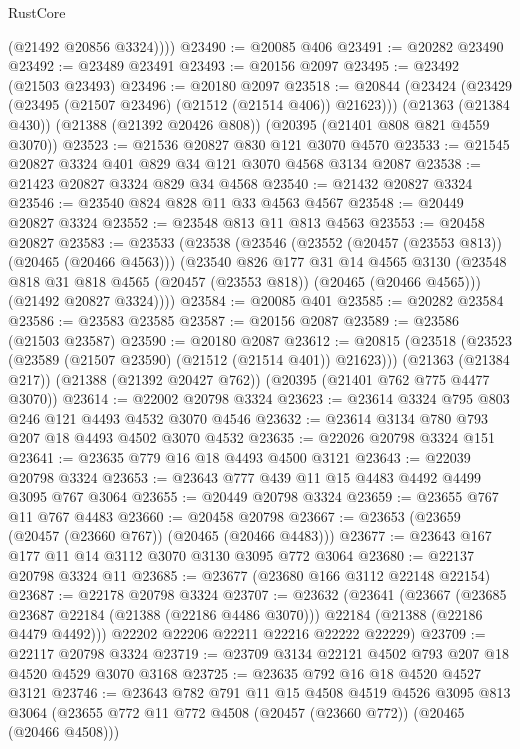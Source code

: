 \begin{lexlean}{RustCore}
\begin{coremodule}
          (@21492 @20856 @3324))))
@23490 := @20085 @406
@23491 := @20282 @23490
@23492 := @23489 @23491
@23493 := @20156 @2097
@23495 := @23492 (@21503 @23493)
@23496 := @20180 @2097
@23518 := @20844
    (@23424 (@23429 (@23495 (@21507 @23496) (@21512 (@21514 @406)) @21623)))
    (@21363 (@21384 @430))
    (@21388 (@21392 @20426 @808))
    (@20395 (@21401 @808 @821 @4559 @3070))
@23523 := @21536 @20827 @830 @121 @3070 @4570
@23533 := @21545 @20827 @3324 @401 @829 @34 @121 @3070 @4568 @3134 @2087
@23538 := @21423 @20827 @3324 @829 @34 @4568
@23540 := @21432 @20827 @3324
@23546 := @23540 @824 @828 @11 @33 @4563 @4567
@23548 := @20449 @20827 @3324
@23552 := @23548 @813 @11 @813 @4563
@23553 := @20458 @20827
@23583 := @23533
    (@23538
      (@23546
        (@23552 (@20457 (@23553 @813)) (@20465 (@20466 @4563)))
        (@23540
          @826
          @177
          @31
          @14
          @4565
          @3130
          (@23548 @818 @31 @818 @4565 (@20457 (@23553 @818)) (@20465 (@20466 @4565)))
          (@21492 @20827 @3324))))
@23584 := @20085 @401
@23585 := @20282 @23584
@23586 := @23583 @23585
@23587 := @20156 @2087
@23589 := @23586 (@21503 @23587)
@23590 := @20180 @2087
@23612 := @20815
    (@23518 (@23523 (@23589 (@21507 @23590) (@21512 (@21514 @401)) @21623)))
    (@21363 (@21384 @217))
    (@21388 (@21392 @20427 @762))
    (@20395 (@21401 @762 @775 @4477 @3070))
@23614 := @22002 @20798 @3324
@23623 := @23614 @3324 @795 @803 @246 @121 @4493 @4532 @3070 @4546
@23632 := @23614 @3134 @780 @793 @207 @18 @4493 @4502 @3070 @4532
@23635 := @22026 @20798 @3324 @151
@23641 := @23635 @779 @16 @18 @4493 @4500 @3121
@23643 := @22039 @20798 @3324
@23653 := @23643 @777 @439 @11 @15 @4483 @4492 @4499 @3095 @767 @3064
@23655 := @20449 @20798 @3324
@23659 := @23655 @767 @11 @767 @4483
@23660 := @20458 @20798
@23667 := @23653 (@23659 (@20457 (@23660 @767)) (@20465 (@20466 @4483)))
@23677 := @23643 @167 @177 @11 @14 @3112 @3070 @3130 @3095 @772 @3064
@23680 := @22137 @20798 @3324 @11
@23685 := @23677 (@23680 @166 @3112 @22148 @22154)
@23687 := @22178 @20798 @3324
@23707 := @23632
    (@23641
      (@23667
        (@23685 @23687 @22184 (@21388 (@22186 @4486 @3070)))
        @22184
        (@21388 (@22186 @4479 @4492)))
      @22202
      @22206
      @22211
      @22216
      @22222
      @22229)
@23709 := @22117 @20798 @3324
@23719 := @23709 @3134 @22121 @4502 @793 @207 @18 @4520 @4529 @3070 @3168
@23725 := @23635 @792 @16 @18 @4520 @4527 @3121
@23746 := @23643
    @782
    @791
    @11
    @15
    @4508
    @4519
    @4526
    @3095
    @813
    @3064
    (@23655 @772 @11 @772 @4508 (@20457 (@23660 @772)) (@20465 (@20466 @4508)))

\end{coremodule}
\end{lexlean}

